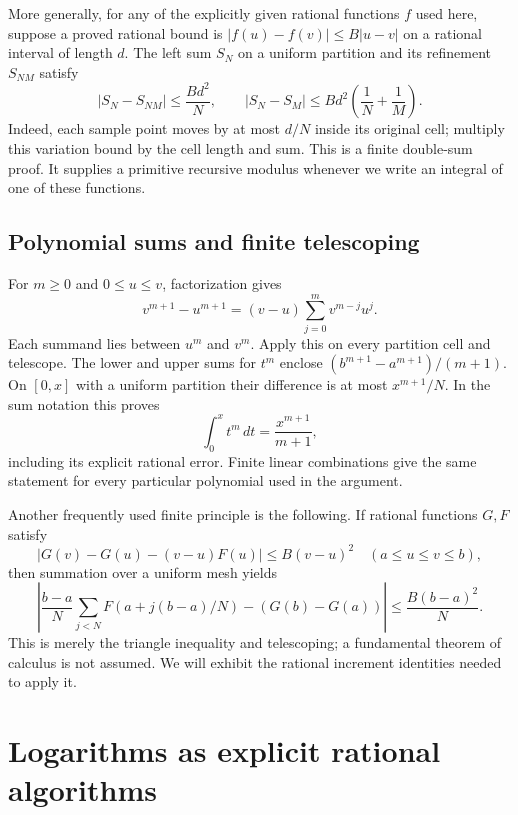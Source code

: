 \documentclass[11pt]{article}
\theoremstyle{definition}
\newcommand{\abs}[1]{\left|#1\right|}
\begin{document}
More generally, for any of the explicitly given rational functions $f$
used here, suppose a proved rational bound is
$\abs{f(u)-f(v)}\le B\abs{u-v}$ on a rational interval of length $d$.
The left sum $S_N$ on a uniform partition and its refinement $S_{NM}$
satisfy
\begin{equation}\label{eq:refine}
 \abs{S_N-S_{NM}}\le\frac{Bd^2}{N},\qquad
 \abs{S_N-S_M}\le Bd^2\left(\frac1N+\frac1M\right).
\end{equation}
Indeed, each sample point moves by at most $d/N$ inside its original cell;
multiply this variation bound by the cell length and sum. This is a finite
double-sum proof. It supplies a primitive recursive modulus whenever we
write an integral of one of these functions.

\subsection{Polynomial sums and finite telescoping}

For $m\ge0$ and $0\le u\le v$, factorization gives
\[
 v^{m+1}-u^{m+1}=(v-u)\sum_{j=0}^m v^{m-j}u^j.
\]
Each summand lies between $u^m$ and $v^m$. Apply this on every partition
cell and telescope. The lower and upper sums for $t^m$ enclose
$(b^{m+1}-a^{m+1})/(m+1)$. On $[0,x]$ with a uniform partition their
difference is at most $x^{m+1}/N$. In the sum notation this proves
\begin{equation}\label{eq:monomial}
 \int_0^x t^m\,dt=\frac{x^{m+1}}{m+1},
\end{equation}
including its explicit rational error. Finite linear combinations give the
same statement for every particular polynomial used in the argument.

Another frequently used finite principle is the following. If rational
functions $G,F$ satisfy
\[
 \abs{G(v)-G(u)-(v-u)F(u)}\le B(v-u)^2
 \quad(a\le u\le v\le b),
\]
then summation over a uniform mesh yields
\begin{equation}\label{eq:FTCfinite}
 \abs{\frac{b-a}{N}\sum_{j<N}F(a+j(b-a)/N)
       -(G(b)-G(a))}\le\frac{B(b-a)^2}{N}.
\end{equation}
This is merely the triangle inequality and telescoping; a fundamental
theorem of calculus is not assumed. We will exhibit the rational
increment identities needed to apply it.

\section{Logarithms as explicit rational algorithms}
\label{sec:log}
\end{document}
